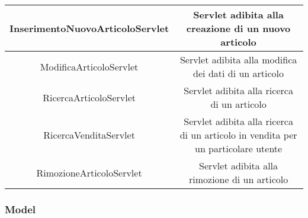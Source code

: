 \documentclass[12pt,a4paper]{article}
\begin{document}
\begin{center}
\begin{tabular}{|c|c|}
InserimentoNuovoArticoloServlet & \begin{minipage}{10cm} \vspace{5pt}
Servlet adibita alla creazione di un nuovo articolo \vspace{5pt}
\end{minipage} \\ \hline

ModificaArticoloServlet & \begin{minipage}{10cm} \vspace{5pt}
Servlet adibita alla modifica dei dati di un articolo \vspace{5pt}
\end{minipage} \\ \hline

RicercaArticoloServlet & \begin{minipage}{10cm} \vspace{5pt}
Servlet adibita alla ricerca di un articolo \vspace{5pt}
\end{minipage} \\ \hline

RicercaVenditaServlet & \begin{minipage}{10cm} \vspace{5pt}
Servlet adibita alla ricerca di un articolo in vendita per un particolare utente \vspace{5pt}
\end{minipage} \\ \hline

RimozioneArticoloServlet & \begin{minipage}{10cm} \vspace{5pt}
Servlet adibita alla rimozione di un articolo \vspace{5pt}
\end{minipage} \\ \hline

\end{tabular}
\end{center}

\subsubsection{Model}
\end{document}
